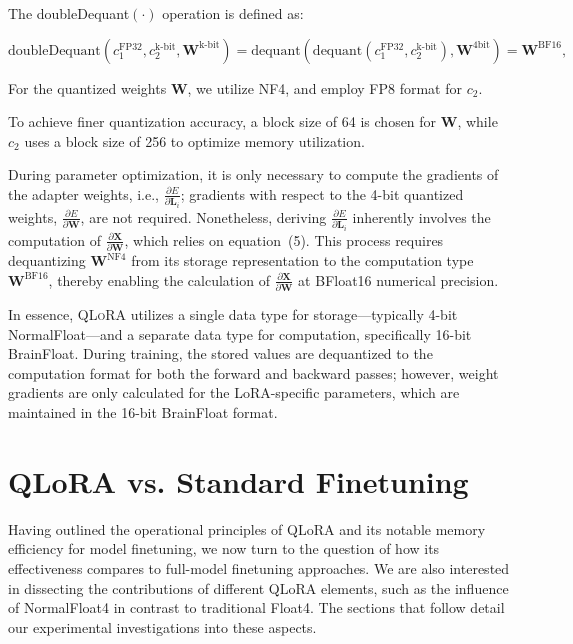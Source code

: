 The doubleDequant$(\cdot)$ operation is defined as:

\begin{equation}
    \text{doubleDequant}(c_1^{\text{FP32}}, c_2^{\text{k-bit}}, \mathbf{W}^{\text{k-bit}}) = \text{dequant}(\text{dequant}(c_1^{\text{FP32}}, c_2^{\text{k-bit}}), \mathbf{W}^{\text{4bit}}) = \mathbf{W}^{\text{BF16}},
\end{equation}

For the quantized weights $\mathbf{W}$, we utilize NF4, and employ FP8 format for $c_2$.

To achieve finer quantization accuracy, a block size of 64 is chosen for $\mathbf{W}$, while $c_2$ uses a block size of 256 to optimize memory utilization.

During parameter optimization, it is only necessary to compute the gradients of the adapter weights, i.e., $\frac{\partial E}{\partial \mathbf{L}_i}$; gradients with respect to the 4-bit quantized weights, $\frac{\partial E}{\partial \mathbf{W}}$, are not required. Nonetheless, deriving $\frac{\partial E}{\partial \mathbf{L}_i}$ inherently involves the computation of $\frac{\partial \mathbf{X}}{\partial \mathbf{W}}$, which relies on equation~(5). This process requires dequantizing $\mathbf{W}^{\text{NF4}}$ from its storage representation to the computation type $\mathbf{W}^{\text{BF16}}$, thereby enabling the calculation of $\frac{\partial \mathbf{X}}{\partial \mathbf{W}}$ at BFloat16 numerical precision.

In essence, \textsc{QLoRA} utilizes a single data type for storage—typically 4-bit NormalFloat—and a separate data type for computation, specifically 16-bit BrainFloat. During training, the stored values are dequantized to the computation format for both the forward and backward passes; however, weight gradients are only calculated for the LoRA-specific parameters, which are maintained in the 16-bit BrainFloat format.

\section{QLoRA vs. Standard Finetuning}
\label{sec:comp_to_std}

Having outlined the operational principles of QLoRA and its notable memory efficiency for model finetuning, we now turn to the question of how its effectiveness compares to full-model finetuning approaches. We are also interested in dissecting the contributions of different QLoRA elements, such as the influence of NormalFloat4 in contrast to traditional Float4. The sections that follow detail our experimental investigations into these aspects.


